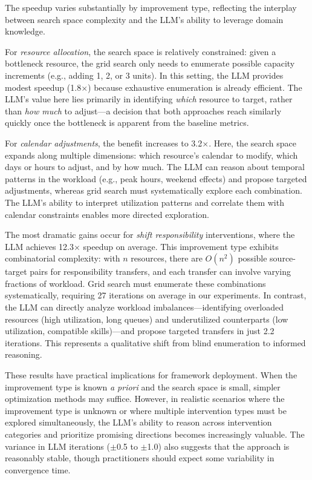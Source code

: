 \documentclass[preprint,12pt]{elsarticle}
\begin{document}
The speedup varies substantially by improvement type, reflecting the interplay between search space complexity and the LLM's ability to leverage domain knowledge.

For \textit{resource allocation}, the search space is relatively constrained: given a bottleneck resource, the grid search only needs to enumerate possible capacity increments (e.g., adding 1, 2, or 3 units). In this setting, the LLM provides modest speedup (1.8$\times$) because exhaustive enumeration is already efficient. The LLM's value here lies primarily in identifying \textit{which} resource to target, rather than \textit{how much} to adjust---a decision that both approaches reach similarly quickly once the bottleneck is apparent from the baseline metrics.

For \textit{calendar adjustments}, the benefit increases to 3.2$\times$. Here, the search space expands along multiple dimensions: which resource's calendar to modify, which days or hours to adjust, and by how much. The LLM can reason about temporal patterns in the workload (e.g., peak hours, weekend effects) and propose targeted adjustments, whereas grid search must systematically explore each combination. The LLM's ability to interpret utilization patterns and correlate them with calendar constraints enables more directed exploration.

The most dramatic gains occur for \textit{shift responsibility} interventions, where the LLM achieves 12.3$\times$ speedup on average. This improvement type exhibits combinatorial complexity: with $n$ resources, there are $O(n^2)$ possible source-target pairs for responsibility transfers, and each transfer can involve varying fractions of workload. Grid search must enumerate these combinations systematically, requiring 27 iterations on average in our experiments. In contrast, the LLM can directly analyze workload imbalances---identifying overloaded resources (high utilization, long queues) and underutilized counterparts (low utilization, compatible skills)---and propose targeted transfers in just 2.2 iterations. This represents a qualitative shift from blind enumeration to informed reasoning.

These results have practical implications for framework deployment. When the improvement type is known \textit{a priori} and the search space is small, simpler optimization methods may suffice. However, in realistic scenarios where the improvement type is unknown or where multiple intervention types must be explored simultaneously, the LLM's ability to reason across intervention categories and prioritize promising directions becomes increasingly valuable. The variance in LLM iterations ($\pm$0.5 to $\pm$1.0) also suggests that the approach is reasonably stable, though practitioners should expect some variability in convergence time.
\end{document}
